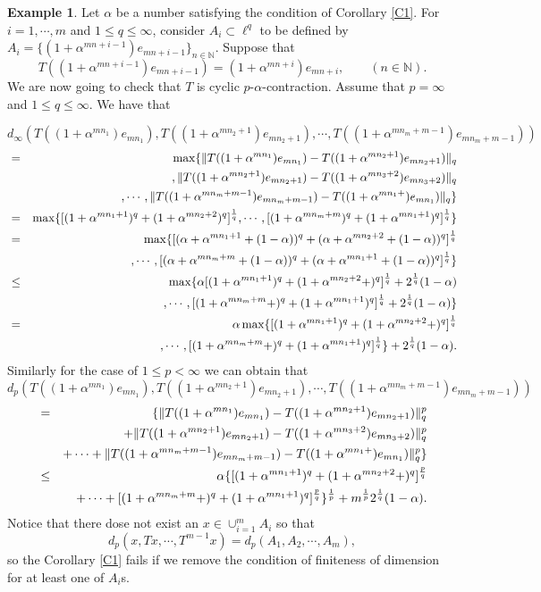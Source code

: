 \documentclass{amsart}
\theoremstyle{definition}
\newtheorem{example}[theorem]{Example}
\theoremstyle{remark}
\begin{document}
\begin{example}
Let $\alpha$ be a number satisfying the condition of Corollary \ref{C1}. For $i=1,\cdots,m$ and $1\leq q\leq\infty$, consider $A_i\subset \ell^q$ to be defined by $A_i=\{(1+\alpha^{mn+i-1})e_{mn+i-1}\}_{n\in\mathbb{N}}$. Suppose that
$$T((1+\alpha^{mn+i-1})e_{mn+i-1})=(1+\alpha^{mn+i})e_{mn+i},\qquad(n\in\mathbb{N}).$$
We are now going to check that $T$ is cyclic $p$-$\alpha$-contraction. Assume that $p=\infty$ and $1\leq q\leq\infty$. We have that

$$d_\infty(T((1+\alpha^{mn_1})e_{mn_1}),T((1+\alpha^{mn_2+1})e_{mn_2+1}),\cdots,T((1+\alpha^{mn_m+m-1})e_{mn_m+m-1}))$$
\begin{eqnarray*}
&=&\max\{\|T((1+\alpha^{mn_1})e_{mn_1})-T((1+\alpha^{mn_2+1})e_{mn_2+1})\|_q\\&&,\|T((1+\alpha^{mn_2+1})e_{mn_2+1})-T((1+\alpha^{mn_3+2})e_{mn_3+2})\|_q\\&&,\cdots,\|T((1+\alpha^{mn_{m}+m-1})e_{mn_{m}+m-1})-T((1+\alpha^{mn_1+})e_{mn_1})\|_q\}\\
&=&\max\{[(1+\alpha^{mn_1+1})^q+(1+\alpha^{mn_2+2})^q]^{1\over q},\cdots,[(1+\alpha^{mn_m+m})^q+(1+\alpha^{mn_1+1})^q]^{1\over q}\}\\
&=&\max\{[(\alpha+\alpha^{mn_1+1}+(1-\alpha))^q+(\alpha+\alpha^{mn_2+2}+(1-\alpha))^q]^{1\over q}\\&&,\cdots,[(\alpha+\alpha^{mn_m+m}+(1-\alpha))^q+(\alpha+\alpha^{mn_1+1}+(1-\alpha))^q]^{1\over q}\}\\
&\leq&\max\{\alpha[(1+\alpha^{mn_1+1})^q+(1+\alpha^{mn_2+2}+)^q]^{1\over q}+2^{1\over q}(1-\alpha)\\&&,\cdots,[(1+\alpha^{mn_m+m}+)^q+(1+\alpha^{mn_1+1})^q]^{1\over q}+2^{1\over q}(1-\alpha)\}\\&
=&\alpha\max\{[(1+\alpha^{mn_1+1})^q+(1+\alpha^{mn_2+2}+)^q]^{1\over q}\\&&,\cdots,[(1+\alpha^{mn_m+m}+)^q+(1+\alpha^{mn_1+1})^q]^{1\over q}\}+2^{1\over q}(1-\alpha).
\end{eqnarray*}
Similarly for the case of $1\leq p<\infty$ we can obtain that
$$d_p(T((1+\alpha^{mn_1})e_{mn_1}),T((1+\alpha^{mn_2+1})e_{mn_2+1}),\cdots,T((1+\alpha^{mn_m+m-1})e_{mn_m+m-1}))$$
\begin{eqnarray*}
&=&\{\|T((1+\alpha^{mn_1})e_{mn_1})-T((1+\alpha^{mn_2+1})e_{mn_2+1})\|_q^p\\&&+\|T((1+\alpha^{mn_2+1})e_{mn_2+1})-T((1+\alpha^{mn_3+2})e_{mn_3+2})\|_q^p\\&&+\cdots+\|T((1+\alpha^{mn_{m}+m-1})e_{mn_{m}+m-1})-T((1+\alpha^{mn_1+})e_{mn_1})\|_q^p\}\\&\leq&\alpha\{[(1+\alpha^{mn_1+1})^q+(1+\alpha^{mn_2+2}+)^q]^{p\over q}\\&&+\cdots+[(1+\alpha^{mn_m+m}+)^q+(1+\alpha^{mn_1+1})^q]^{p\over q}\}^{1\over p}+m^{1\over p}2^{1\over q}(1-\alpha).
\end{eqnarray*}
Notice that there dose not exist an $x\in\cup_{i=1}^mA_i$ so that
$$d_p(x,Tx,\cdots,T^{m-1}x)=d_p(A_1,A_2,\cdots,A_m),$$ so the Corollary \ref{C1} fails if we remove the condition of finiteness of dimension for at least one of $A_i$s.
\end{example}
\end{document}

